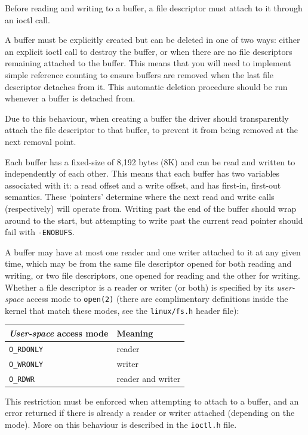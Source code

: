 \documentclass[12pt,a4paper]{article}
\begin{document}
Before reading and writing to a buffer, a file descriptor must attach to it
through an ioctl call.

A buffer must be explicitly created but can be deleted in one of two ways:
either an explicit ioctl call to destroy the buffer, or when there are no file
descriptors remaining attached to the buffer. This means that you will need to
implement simple reference counting to ensure buffers are removed when the last
file descriptor detaches from it. This automatic deletion procedure should be
run whenever a buffer is detached from.

Due to this behaviour, when creating a buffer the driver should transparently
attach the file descriptor to that buffer, to prevent it from being removed
at the next removal point.

Each buffer has a fixed-size of 8,192 bytes (8K) and can be read and written to
independently of each other. This means that each buffer has two variables
associated with it: a read offset and a write offset, and has first-in,
first-out semantics. These `pointers' determine where the next read and write
calls (respectively) will operate from. Writing past the end of the buffer
should wrap around to the start, but attempting to write past the current read
pointer should fail with \texttt{-ENOBUFS}.

A buffer may have at most one reader and one writer attached to it at any given
time, which may be from the same file descriptor opened for both reading and
writing, or two file descriptors, one opened for reading and the other for
writing. Whether a file descriptor is a reader or writer (or both) is specified
by its \textit{user-space} access mode to \texttt{open(2)} (there are
complimentary definitions inside the kernel that match these modes, see the
\texttt{linux/fs.h} header file):

\begin{longtable}{l l}
    \toprule
    \textbf{\textit{User-space} access mode} & \textbf{Meaning} \\
    \midrule

    \texttt{O\_RDONLY} & reader \\
    \texttt{O\_WRONLY} & writer \\
    \texttt{O\_RDWR} & reader and writer \\

    \bottomrule
\end{longtable}

This restriction must be enforced when attempting to attach to a buffer, and an
error returned if there is already a reader or writer attached (depending on
the mode). More on this behaviour is described in the \texttt{ioctl.h} file.
\end{document}
